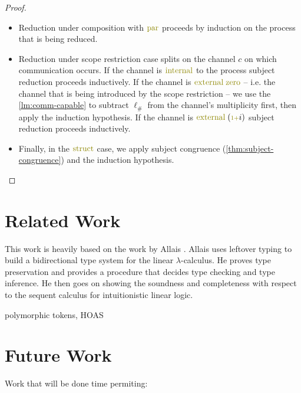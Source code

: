 \documentclass[a4paper,UKenglish,cleveref, autoref, thm-restate,authorcolumns]{lipics-v2019}
\theoremstyle{definition}
\newcommand{\lambdacalc}{$\lambda$-calculus}
\newcommand{\constr}[1]{\textcolor{olive}{\operatorname{#1}}}
\newcommand{\suc}{\constr{\scriptstyle 1+}}
\newcommand{\lio}{\ell_{\#}}
\begin{document}
\begin{proof}
\begin{itemize}
    \item
    Reduction under composition with $\constr{par}$ proceeds by induction on the process that is being reduced.

    \item
    Reduction under scope restriction case splits on the channel $c$ on which communication occurs.
    If the channel is $\constr{internal}$ to the process subject reduction proceeds inductively.
    If the channel is $\constr{external}\; \constr{zero}$ -- i.e. the channel that is being introduced by the scope restriction -- we use the \autoref{lm:comm-capable} to subtract $\lio$ from the channel's multiplicity first, then apply the induction hypothesis.
    If the channel is $\constr{external}\; (\suc i)$ subject reduction proceeds inductively.

    \item
    Finally, in the $\constr{struct}$ case, we apply subject congruence (\autoref{thm:subject-congruence}) and the induction hypothesis.
  \end{itemize}
\end{proof}

\section{Related Work}

This work is heavily based on the work by Allais \cite{Allais2018a}.
Allais uses leftover typing to build a bidirectional type system for the linear \lambdacalc{}.
He proves type preservation and provides a procedure that decides type checking and type inference.
He then goes on showing the soundness and completeness with respect to the sequent calculus for intuitionistic linear logic.

\cite{Thiemann2019}
\cite{Rouvoet2020}
\cite{Veltri2020}

\cite{previous-work} polymorphic tokens, HOAS

\cite{LTS-semantics}

\section{Future Work}

Work that will be done time permiting:
\end{document}
